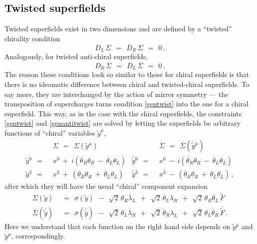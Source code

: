 \documentclass[epsfig,12pt]{article}
\def\beq{\begin{equation}}
\def\eeq{\end{equation}}
\newcommand{\wt}{\widetilde}
\newcommand{\ov}{\overline}
\begin{document}
\subsection{Twisted superfields}


	Twisted superfields exist in two dimensions and are defined by a ``twisted'' chirality condition
\beq
\label{gentwist}
	D_L\, \Sigma    ~~=~~    \ov D{}_R\, \Sigma    ~~=~~    0\,.
\eeq
	Analogously, for twisted anti-chiral superfields,
\beq
\label{genantitwist}
	D_R\, \ov\Sigma    ~~=~~    \ov D{}_L\, \ov\Sigma    ~~=~~    0\,.
\eeq
	The reason these conditions look so similar to those for chiral superfields is that
	there is no ideomatic difference between chiral and twisted-chiral superfields.
	To say more, they are interchanged by the action of mirror symmetry ---
	the transposition of supercharges turns condition \eqref{gentwist} into 
	the one for a chiral superfield.
	This way, as in the case with the chiral superfields, 
	the constraints \eqref{gentwist} and \eqref{genantitwist} are solved by letting
	the superfields be arbitrary functions of ``chiral'' variables $ \wt y^\mu $,
\begin{align*}
	& \Sigma    ~~=~~    \Sigma(\wt y{}^\mu)
	&
	& \ov\Sigma    ~~=~~    \ov\Sigma(\ov{\wt y}{}^\mu)
	\\[2mm]
	\wt y{}^0    ~~=~~ &    x^0  ~+~ i \left( \ov\theta{}_R\theta_R  ~-~  \ov\theta{}_L\theta_L \right)
	&
	\ov{\wt y}{}^0     ~~=~~ &    x^0  ~-~ i \left( \ov\theta{}_R\theta_R  ~-~  \ov\theta{}_L\theta_L \right)
	\\[2mm]
	\wt y{}^3    ~~=~~ &    x^3  ~+~ \left( \ov\theta{}_R\theta_R  ~+~  \ov\theta{}_L\theta_L \right)
	&
	\ov{\wt y}{}^3    ~~=~~ &    x^3  ~-~ \left( \ov\theta{}_R\theta_R  ~+~  \ov\theta{}_L\theta_L \right)
	\,,
\end{align*}
	after which they will have the usual ``chiral'' component expansion
\begin{align*}
	\Sigma(\wt y)    & ~~=~~    \sigma(\wt y)  ~~-~~  \sqrt{2}\, \theta_R \ov\lambda{}_L
						   ~~+~~  \sqrt{2}\, \ov\theta{}_L \lambda_R
						   ~~+~~  \sqrt{2}\, \theta_R \ov\theta{}_L\, \wt{F}
	\\[2mm]
	\ov\Sigma(\ov{\wt y})    & ~~=~~    \ov\sigma(\ov{\wt y})  ~~-~~ \sqrt{2}\, \theta_L \ov\lambda{}_R
								   ~~+~~ \sqrt{2}\, \ov\theta{}_R \lambda_L
								   ~~+~~ \sqrt{2}\, \theta_L \ov\theta{}_R\, \ov{\wt F}
	\,.
\end{align*}
	Here we understand that each function on the right hand side depends on 
	$ \wt y{}^\mu $ and $ \ov{\wt y}{}^\mu $, correspondingly.
\end{document}
